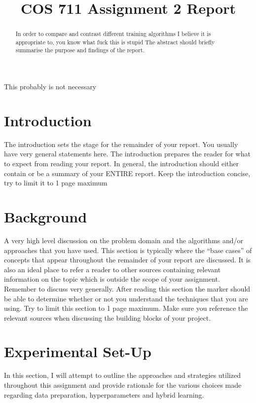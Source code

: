 \documentclass[conference]{IEEEtran}
\begin{document}
\title{COS 711 Assignment 2 Report\\
}

\author{
}

\maketitle

\begin{abstract}
In order to compare and contrast different training algorithms I believe it is appropriate to, you know what fuck this is stupid
The abstract should briefly summarise the purpose and findings of the report.
\end{abstract}

\begin{IEEEkeywords}
This probably is not necessary
\end{IEEEkeywords}

\section{Introduction}
The introduction sets the stage for the remainder of your report. You usually have very general statements here. The introduction prepares the reader for what to expect from reading your report. In general, the introduction should either contain or be a summary of your ENTIRE report. Keep the introduction concise, try to limit it to 1 page maximum

\section{Background}
A very high level discussion on the problem domain and the algorithms and/or approaches that you have used. This section is typically where the “base cases” of concepts that appear throughout the remainder of your report are discussed. It is also an ideal place to refer a reader to other sources containing relevant information on the topic which is outside the scope of your assignment. Remember to discuss very generally. After reading this section the marker should be able to determine whether or not you understand the techniques that you are using. Try to limit this section to 1 page maximum. Make sure you reference the relevant sources when discussing the building blocks of your project.

\section{Experimental Set-Up}
In this section, I will attempt to outline the approaches and strategies utilized throughout this assignment and provide rationale for the various choices made regarding data preparation, hyperparameters and hybrid learning.
\end{document}
